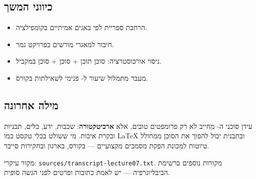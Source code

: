 \subsection{כיווני המשך}

\begin{itemize}[rightmargin=2em]
  \item הרחבת ספריית  לפי באגים אמיתיים בקומפילציה.
  \item חיבור  למאגרי  מורשים בפרויקט גמר.
  \item ניסוי אורכוסטרציה: סוכן תוכן + סוכן  + סוכן  במקביל.
  \item מעבר מתמלול שיעור ל- פנימי לשאילתות בקורס.
\end{itemize}

\subsection{מילה אחרונה}

עידן סוכני ה- מחייב לא רק פרומפטים טובים, אלא \textbf{ארכיטקטורה}:
שכבות, ידע, כלים, תבניות ובקרת איכות. מי ששולט בכלי טקסט כמו \LaTeX{}
ובתבנית  יכול להפוך את הסוכן ממחולל טיוטות למכונת הפקת מסמכים
מקצועיים --- בקורס, בארגון ובחקירות סייבר.

\begin{notebox}
מקור עיקרי: \texttt{sources/transcript-lecture07.txt}. מקורות נוספים
ברשימת הביבליוגרפיה --- יש לאמת כתובות ופרטים לפני הגשה סופית.
\end{notebox}
